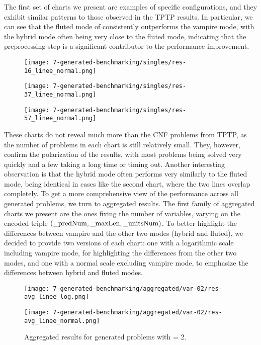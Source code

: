 The first set of charts we present are examples of specific configurations, and they exhibit similar patterns to those observed in the TPTP results.
In particular, we can see that the fluted mode of consistently outperforms the vampire mode, with the hybrid mode often being very close to the fluted mode, indicating that the preprocessing step is a significant contributor to the performance improvement.

\begin{figure}[H]
  \centering
  \texttt{[image: 7-generated-benchmarking/singles/res-16\_linee\_normal.png]}
\end{figure}
\begin{figure}[H]
    \centering
    \texttt{[image: 7-generated-benchmarking/singles/res-37\_linee\_normal.png]}
\end{figure}
\begin{figure}[H]
    \centering
    \texttt{[image: 7-generated-benchmarking/singles/res-57\_linee\_normal.png]}
\end{figure}

These charts do not reveal much more than the CNF problems from TPTP, as the number of problems in each chart is still relatively small.
They, however, confirm the polarization of the results, with most problems being solved very quickly and a few taking a long time or timing out.
Another interesting observation is that the hybrid mode often performs very similarly to the fluted mode, being identical in cases like the second chart, where the two lines overlap completely.
To get a more comprehensive view of the performance across all generated problems, we turn to aggregated results.
The first family of aggregated charts we present are the ones fixing the number of variables, varying on the encoded triple \((\text{\code{_predNum}}, \text{\code{_maxLen}}, \text{\code{_unitsNum}})\).
To better highlight the differences between vampire and the other two modes (hybrid and fluted), we decided to provide two versions of each chart: one with a logarithmic scale including vampire mode, for highlighting the differences from the other two modes, and one with a normal scale excluding vampire mode, to emphasize the differences between hybrid and fluted modes.
\begin{figure}[H]
  \centering
  \begin{minipage}{1\textwidth}
    \centering
    \texttt{[image: 7-generated-benchmarking/aggregated/var-02/res-avg\_linee\_log.png]}
  \end{minipage}
  \hfill
  \begin{minipage}{1\textwidth}
    \centering
    \texttt{[image: 7-generated-benchmarking/aggregated/var-02/res-avg\_linee\_normal.png]}
  \end{minipage}
  \caption{Aggregated results for generated problems with  = 2.}\label{fig:agg-var2}
\end{figure}

